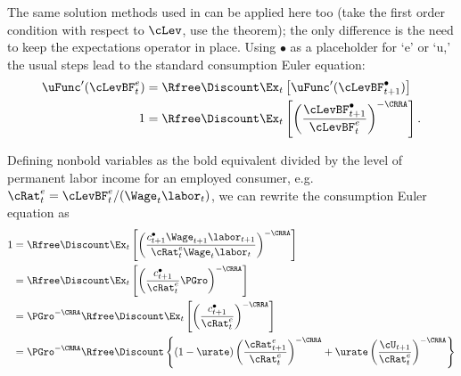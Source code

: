 \documentclass{\handout}
\begin{document}
The same solution methods used in  can 
be applied here too (take the first order condition with respect to $\cLev$, use
the  theorem); the only difference is the need to keep the expectations operator
in place.  Using $\bullet$ as a placeholder for `e' or `u,' the
usual steps lead to the standard consumption Euler equation:
\begin{equation}\begin{gathered}\begin{aligned}\label{eq:ctp1Oct}
        \uFunc^{\prime}(\cLevBF^{e}_{t}) & =  \Rfree\Discount \Ex_{t}\left[\uFunc^{\prime}(\cLevBF^{\bullet}_{t+1}) \right]
\\  1         & =  \Rfree\Discount \Ex_{t}\left[\left(\frac{\cLevBF^{\bullet}_{t+1}}{\cLevBF^{e}_{t}}\right)^{-\CRRA} \right]
.
\end{aligned}\end{gathered}\end{equation}

Defining nonbold variables as the bold equivalent divided by the level of permanent labor income for an employed consumer, e.g.\ ${\cRat}^{e}_{t}=\cLevBF^{e}_{t}/(\Wage_{t}\labor_{t})$, we can rewrite the consumption Euler equation as
\begin{equation}\label{eq:Explicit}\begin{split}
  1         & =  \Rfree\Discount \Ex_{t}\left[\left(\frac{{c}^{\bullet}_{t+1} \Wage_{t+1}\labor_{t+1}}{{\cRat}^{e}_{t} \Wage_{t}\labor_{t}}\right)^{-\CRRA} \right]  
\\          & =  \Rfree\Discount \Ex_{t}\left[\left(\frac{{c}^{\bullet}_{t+1}}{{\cRat}^{e}_{t}}\PGro\right)^{-\CRRA} \right]
\\          & =  \PGro^{-\CRRA}\Rfree\Discount \Ex_{t}\left[\left(\frac{{c}^{\bullet}_{t+1}}{{\cRat}^{e}_{t}}\right)^{-\CRRA} \right] 
\\          & =  \PGro^{-\CRRA}\Rfree\Discount \left\{(1-\urate)\left(\frac{{\cRat}^{e}_{t+1}}{{\cRat}^{e}_{t}}\right)^{-\CRRA}+\urate \left(\frac{\cU_{t+1}}{{\cRat}^{e}_{t}}\right)^{-\CRRA}\right\} 
\end{split}\end{equation}
\end{document}
